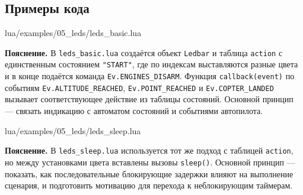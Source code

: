 \subsection{Примеры кода}
\begin{codefile}{lua/examples/05_leds/leds_basic.lua}
\end{codefile}
\textbf{Пояснение.} В \verb|leds_basic.lua| создаётся объект \verb|Ledbar| и таблица \verb|action| с единственным состоянием \verb|"START"|, где по индексам выставляются разные цвета и в конце подаётся команда \verb|Ev.ENGINES_DISARM|. Функция \verb|callback(event)| по событиям \verb|Ev.ALTITUDE_REACHED|, \verb|Ev.POINT_REACHED| и \verb|Ev.COPTER_LANDED| вызывает соответствующее действие из таблицы состояний. Основной принцип — связать индикацию с автоматом состояний и событиями автопилота.

\begin{codefile}{lua/examples/05_leds/leds_sleep.lua}
\end{codefile}
\textbf{Пояснение.} В \verb|leds_sleep.lua| используется тот же подход с таблицей \verb|action|, но между установками цвета вставлены вызовы \verb|sleep()|. Основной принцип — показать, как последовательные блокирующие задержки влияют на выполнение сценария, и подготовить мотивацию для перехода к неблокирующим таймерам.
